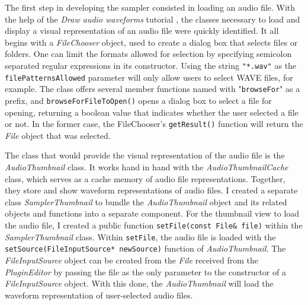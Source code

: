 \documentclass[12pt, a4paper, hidelinks]{report}
\begin{document}
	The first step in developing the sampler consisted in loading an audio file. With the help of the \textit{Draw audio waveforms} tutorial \cite{audiothumbnail}, the classes necessary to load and display a visual representation of an audio file were quickly identified. It all begins with a \textit{FileChooser} object, used to create a dialog box that selects files or folders. One can limit the formats allowed for selection by specifying semicolon separated regular expressions in its constructor. Using the string \texttt{"*.wav"} as the \texttt{filePatternsAllowed} parameter will only allow users to select WAVE files, for example. The class offers several member functions named with "\texttt{browseFor}" as a prefix, and \texttt{browseForFileToOpen()} opens a dialog box to select a file for opening, returning a boolean value that indicates whether the user selected a file or not. In the former case, the FileChooser's \texttt{getResult()} function will return the \textit{File} object that was selected. \par
	The class that would provide the visual representation of the audio file is the \textit{AudioThumbnail} class. It works hand in hand with the \textit{AudioThumbnailCache} class, which serves as a cache memory of audio file representations. Together, they store and show waveform representations of audio files. I created a separate class \textit{SamplerThumbnail} to bundle the \textit{AudioThumbnail} object and its related objects and functions into a separate component. For the thumbnail view to load the audio file, I created a public function \texttt{setFile(const File\& file)} within the \textit{SamplerThumbnail} class. Within \texttt{setFile}, the audio file is loaded with the \texttt{setSource(FileInputSource* newSource)} function of \textit{AudioThumbnail}. The \textit{FileInputSource} object can be created from the \textit{File} received from the \textit{PluginEditor} by passing the file as the only parameter to the constructor of a \textit{FileInputSource} object. With this done, the \textit{AudioThumbnail} will load the waveform representation of user-selected audio files.\par
	
\end{document}
